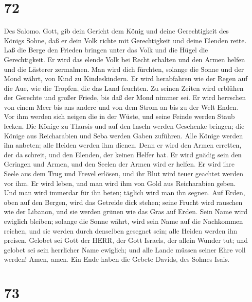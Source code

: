 \hypertarget{section-71}{%
\section{72}\label{section-71}}

 Des Salomo. Gott, gib dein Gericht dem König und deine
Gerechtigkeit des Königs Sohne,  daß er dein Volk richte mit
Gerechtigkeit und deine Elenden rette.  Laß die Berge den
Frieden bringen unter das Volk und die Hügel die Gerechtigkeit.
 Er wird das elende Volk bei Recht erhalten und den Armen
helfen und die Lästerer zermalmen.  Man wird dich fürchten,
solange die Sonne und der Mond währt, von Kind zu Kindeskindern.
 Er wird herabfahren wie der Regen auf die Aue, wie die
Tropfen, die das Land feuchten.  Zu seinen Zeiten wird
erblühen der Gerechte und großer Friede, bis daß der Mond nimmer sei.
 Er wird herrschen von einem Meer bis ans andere und von dem
Strom an bis zu der Welt Enden.  Vor ihm werden sich neigen
die in der Wüste, und seine Feinde werden Staub lecken. 
Die Könige zu Tharsis und auf den Inseln werden Geschenke bringen; die
Könige aus Reicharabien und Seba werden Gaben zuführen. 
Alle Könige werden ihn anbeten; alle Heiden werden ihm dienen.
 Denn er wird den Armen erretten, der da schreit, und den
Elenden, der keinen Helfer hat.  Er wird gnädig sein den
Geringen und Armen, und den Seelen der Armen wird er helfen.
 Er wird ihre Seele aus dem Trug und Frevel erlösen, und
ihr Blut wird teuer geachtet werden vor ihm.  Er wird
leben, und man wird ihm von Gold aus Reicharabien geben. Und man wird
immerdar für ihn beten; täglich wird man ihn segnen.  Auf
Erden, oben auf den Bergen, wird das Getreide dick stehen; seine Frucht
wird rauschen wie der Libanon, und sie werden grünen wie das Gras auf
Erden.  Sein Name wird ewiglich bleiben; solange die Sonne
währt, wird sein Name auf die Nachkommen reichen, und sie werden durch
denselben gesegnet sein; alle Heiden werden ihn preisen. 
Gelobet sei Gott der HERR, der Gott Israels, der allein Wunder tut;
 und gelobet sei sein herrlicher Name ewiglich; und alle
Lande müssen seiner Ehre voll werden! Amen, amen.  Ein Ende
haben die Gebete Davids, des Sohnes Isais.

\hypertarget{section-72}{%
\section{73}\label{section-72}}

